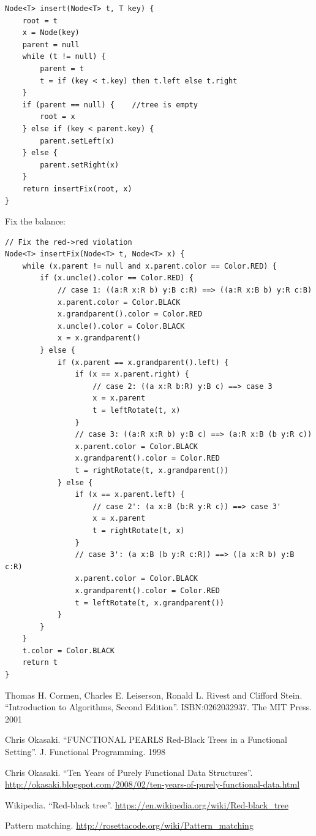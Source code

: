 \documentclass[b5paper]{article}
\begin{document}
\begin{lstlisting}[language = Bourbaki]
Node<T> insert(Node<T> t, T key) {
    root = t
    x = Node(key)
    parent = null
    while (t != null) {
        parent = t
        t = if (key < t.key) then t.left else t.right
    }
    if (parent == null) {    //tree is empty
        root = x
    } else if (key < parent.key) {
        parent.setLeft(x)
    } else {
        parent.setRight(x)
    }
    return insertFix(root, x)
}
\end{lstlisting}

Fix the balance:

\begin{lstlisting}[language = Bourbaki]
// Fix the red->red violation
Node<T> insertFix(Node<T> t, Node<T> x) {
    while (x.parent != null and x.parent.color == Color.RED) {
        if (x.uncle().color == Color.RED) {
            // case 1: ((a:R x:R b) y:B c:R) ==> ((a:R x:B b) y:R c:B)
            x.parent.color = Color.BLACK
            x.grandparent().color = Color.RED
            x.uncle().color = Color.BLACK
            x = x.grandparent()
        } else {
            if (x.parent == x.grandparent().left) {
                if (x == x.parent.right) {
                    // case 2: ((a x:R b:R) y:B c) ==> case 3
                    x = x.parent
                    t = leftRotate(t, x)
                }
                // case 3: ((a:R x:R b) y:B c) ==> (a:R x:B (b y:R c))
                x.parent.color = Color.BLACK
                x.grandparent().color = Color.RED
                t = rightRotate(t, x.grandparent())
            } else {
                if (x == x.parent.left) {
                    // case 2': (a x:B (b:R y:R c)) ==> case 3'
                    x = x.parent
                    t = rightRotate(t, x)
                }
                // case 3': (a x:B (b y:R c:R)) ==> ((a x:R b) y:B c:R)
                x.parent.color = Color.BLACK
                x.grandparent().color = Color.RED
                t = leftRotate(t, x.grandparent())
            }
        }
    }
    t.color = Color.BLACK
    return t
}
\end{lstlisting}

\ifx\wholebook\relax \else
\begin{thebibliography}{99}

Thomas H. Cormen, Charles E. Leiserson, Ronald L. Rivest and Clifford Stein.
``Introduction to Algorithms, Second Edition''. ISBN:0262032937. The MIT Press. 2001

Chris Okasaki. ``FUNCTIONAL PEARLS Red-Black Trees in a Functional Setting''. J. Functional Programming. 1998

Chris Okasaki. ``Ten Years of Purely Functional Data Structures''. \url{http://okasaki.blogspot.com/2008/02/ten-years-of-purely-functional-data.html}

Wikipedia. ``Red-black tree''. \url{https://en.wikipedia.org/wiki/Red-black_tree}

Pattern matching. \url{http://rosettacode.org/wiki/Pattern_matching}

\end{thebibliography}

\expandafter\enddocument
\fi
\end{document}
